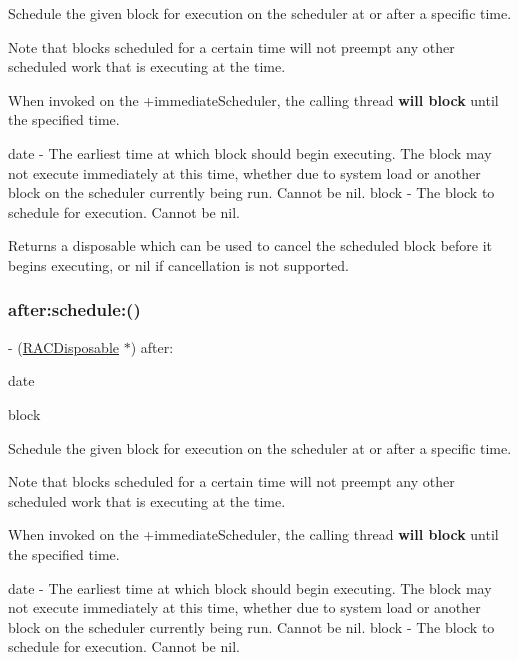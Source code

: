 Schedule the given block for execution on the scheduler at or after a specific time.

Note that blocks scheduled for a certain time will not preempt any other scheduled work that is executing at the time.

When invoked on the +immediate\+Scheduler, the calling thread {\bfseries will block} until the specified time.

date -\/ The earliest time at which {\ttfamily block} should begin executing. The block may not execute immediately at this time, whether due to system load or another block on the scheduler currently being run. Cannot be nil. block -\/ The block to schedule for execution. Cannot be nil.

Returns a disposable which can be used to cancel the scheduled block before it begins executing, or nil if cancellation is not supported. \mbox{\label{interface_r_a_c_scheduler_ada2a84ec6cf8eed043bcef654334c601}} 
\subsubsection{\texorpdfstring{after\+:schedule\+:()}{after:schedule:()}\hspace{0.1cm}{\footnotesize\ttfamily [3/3]}}
{\footnotesize\ttfamily -\/ (\mbox{\hyperlink{interface_r_a_c_disposable}{R\+A\+C\+Disposable}} $\ast$) after\+: \begin{DoxyParamCaption}\item[{(N\+S\+Date $\ast$)}]{date }\item[{schedule:(void($^\wedge$)(void))}]{block }\end{DoxyParamCaption}}

Schedule the given block for execution on the scheduler at or after a specific time.

Note that blocks scheduled for a certain time will not preempt any other scheduled work that is executing at the time.

When invoked on the +immediate\+Scheduler, the calling thread {\bfseries will block} until the specified time.

date -\/ The earliest time at which {\ttfamily block} should begin executing. The block may not execute immediately at this time, whether due to system load or another block on the scheduler currently being run. Cannot be nil. block -\/ The block to schedule for execution. Cannot be nil.

